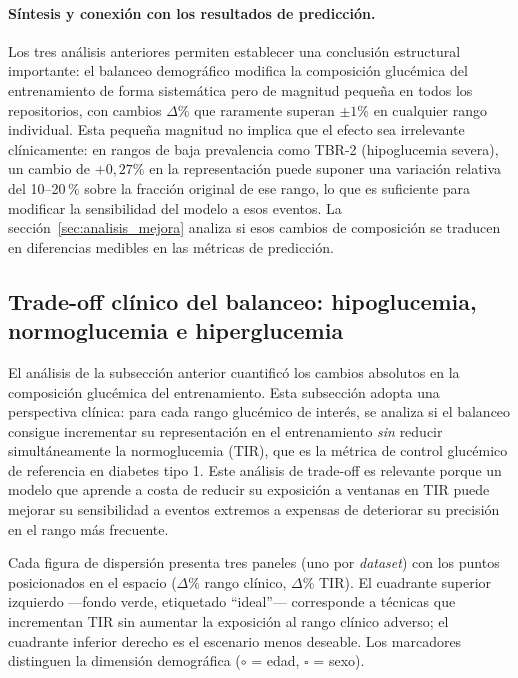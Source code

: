 \paragraph{Síntesis y conexión con los resultados de predicción.}
Los tres análisis anteriores permiten establecer una conclusión estructural
importante: el balanceo demográfico modifica la composición glucémica del
entrenamiento de forma sistemática pero de magnitud pequeña en todos los
repositorios, con cambios $\Delta\%$ que raramente superan $\pm 1\%$ en
cualquier rango individual. Esta pequeña magnitud no implica que el efecto
sea irrelevante clínicamente: en rangos de baja prevalencia como TBR-2
(hipoglucemia severa), un cambio de $+0{,}27\%$ en la representación puede
suponer una variación relativa del 10--20\,\% sobre la fracción original de
ese rango, lo que es suficiente para modificar la sensibilidad del modelo a
esos eventos. La sección~\ref{sec:analisis_mejora} analiza si
esos cambios de composición se traducen en diferencias medibles en las
métricas de predicción.


\subsection{Trade-off clínico del balanceo: hipoglucemia, normoglucemia e hiperglucemia}
\label{subsec:tradeoff_clinico}

El análisis de la subsección anterior cuantificó los cambios absolutos en la
composición glucémica del entrenamiento. Esta subsección adopta una perspectiva
clínica: para cada rango glucémico de interés, se analiza si el balanceo
consigue incrementar su representación en el entrenamiento \emph{sin} reducir
simultáneamente la normoglucemia (TIR), que es la métrica de control glucémico
de referencia en diabetes tipo 1. Este análisis de trade-off es relevante porque
un modelo que aprende a costa de reducir su exposición a ventanas en TIR puede
mejorar su sensibilidad a eventos extremos a expensas de deteriorar su precisión
en el rango más frecuente.

Cada figura de dispersión presenta tres paneles (uno por \textit{dataset}) con
los puntos posicionados en el espacio ($\Delta\%$ rango clínico, $\Delta\%$ TIR).
El cuadrante superior izquierdo ---fondo verde, etiquetado ``ideal''--- corresponde
a técnicas que incrementan TIR sin aumentar la exposición al rango clínico adverso;
el cuadrante inferior derecho es el escenario menos deseable. Los marcadores
distinguen la dimensión demográfica ($\circ$ = edad, $\square$ = sexo).

